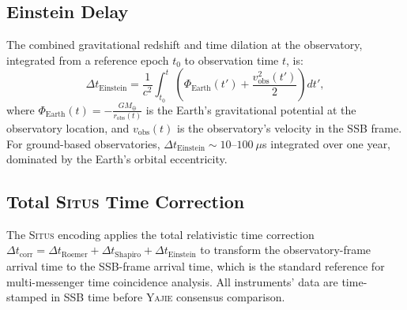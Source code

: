 \documentclass[11pt,a4paper]{article}
\theoremstyle{definition}
\newcommand{\Situs}{\textsc{Situs}}
\newcommand{\Yajie}{\textsc{Yajie}}
\begin{document}
\subsection{Einstein Delay}
The combined gravitational redshift and time dilation at the observatory, integrated from a reference epoch $t_0$ to observation time $t$, is:
\begin{equation}\label{eq:einstein_full}
\Delta t_{\mathrm{Einstein}} = \frac{1}{c^2} \int_{t_0}^{t} \left(\Phi_{\mathrm{Earth}}(t') + \frac{v_{\mathrm{obs}}^2(t')}{2}\right) dt',
\end{equation}
where $\Phi_{\mathrm{Earth}}(t) = -\frac{GM_\oplus}{r_{\mathrm{obs}}(t)}$ is the Earth's gravitational potential at the observatory location, and $v_{\mathrm{obs}}(t)$ is the observatory's velocity in the SSB frame. For ground-based observatories, $\Delta t_{\mathrm{Einstein}} \sim 10$--$100~\mu$s integrated over one year, dominated by the Earth's orbital eccentricity.
\subsection{Total \Situs{} Time Correction}
The \Situs{} encoding applies the total relativistic time correction $\Delta t_{\mathrm{corr}} = \Delta t_{\mathrm{Roemer}} + \Delta t_{\mathrm{Shapiro}} + \Delta t_{\mathrm{Einstein}}$ to transform the observatory-frame arrival time to the SSB-frame arrival time, which is the standard reference for multi-messenger time coincidence analysis. All instruments' data are time-stamped in SSB time before \Yajie{} consensus comparison.
\end{document}
